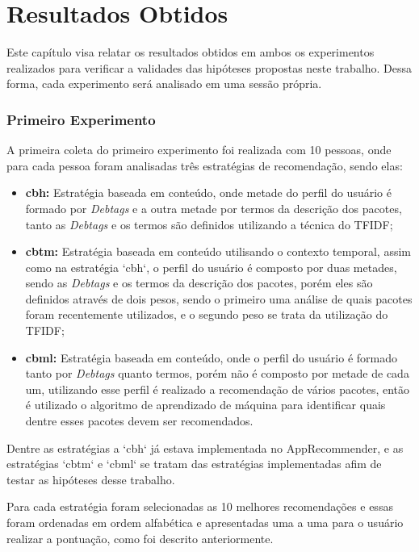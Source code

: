 \chapter[Resultados Obtidos]{Resultados Obtidos}

Este capítulo visa relatar os resultados obtidos em ambos os experimentos
realizados para verificar a validades das hipóteses propostas neste trabalho.
Dessa forma, cada experimento será analisado em uma sessão própria.

\subsection{Primeiro Experimento}

A primeira coleta do primeiro experimento foi realizada com 10 pessoas, onde
para cada pessoa foram analisadas três estratégias de recomendação, sendo elas:

\begin{itemize}
    \item \textbf{cbh:} Estratégia baseada em conteúdo, onde metade do
    perfil do usuário é formado por \textit{Debtags} e a outra metade por termos
    da descrição dos pacotes, tanto as \textit{Debtags} e os termos são definidos
    utilizando a técnica do TFIDF;
    \item \textbf{cbtm:} Estratégia baseada em conteúdo utilisando o contexto
    temporal, assim como na estratégia `cbh`, o perfil do usuário é composto
    por duas metades, sendo as \textit{Debtags} e os termos da descrição dos pacotes,
    porém eles são definidos através de dois pesos, sendo o primeiro uma
    análise de quais pacotes foram recentemente utilizados, e o segundo peso
    se trata da utilização do TFIDF;
    \item \textbf{cbml:} Estratégia baseada em conteúdo, onde o perfil do
    usuário é formado tanto por \textit{Debtags} quanto termos, porém não é composto
    por metade de cada um, utilizando esse perfil é realizado a
    recomendação de vários pacotes, então é utilizado o algoritmo de
    aprendizado de máquina para identificar quais dentre esses pacotes
    devem ser recomendados.
\end{itemize}

Dentre as estratégias a `cbh` já estava implementada no AppRecommender, e as
estratégias `cbtm` e `cbml` se tratam das estratégias implementadas afim de
testar as hipóteses desse trabalho.

Para cada estratégia foram selecionadas as 10 melhores recomendações
e essas foram ordenadas em ordem alfabética e apresentadas uma a uma para
o usuário realizar a pontuação, como foi descrito anteriormente.

